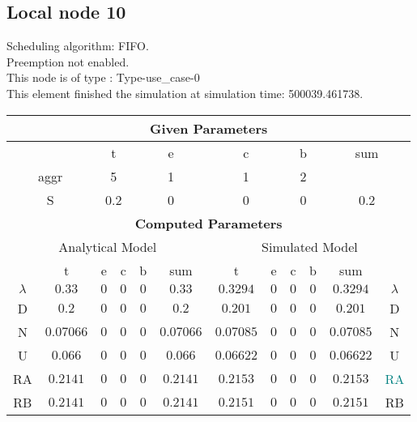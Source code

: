 \documentclass{article}
\begin{document}
\subsection{Local node 10}
Scheduling algorithm: FIFO.\\Preemption not enabled. \\This node is of type : Type-use\_case-0\\
This element finished the simulation at simulation time: 500039.461738.\\
\begin{table}[H]\centering\begin{tabular}{@{}c|cccc|c||cccc|c|c@{}}\toprule\multicolumn{12}{c}{\textbf{Given Parameters}}\\\midrule\multicolumn{2}{c|}{ } & \multicolumn{2}{c}{t} & \multicolumn{2}{c}{e} & \multicolumn{2}{c}{c} & \multicolumn{2}{c}{b} & \multicolumn{2}{|c}{sum} \\\midrule\multicolumn{2}{c|}{aggr} & \multicolumn{2}{c}{5} & \multicolumn{2}{c}{1} & \multicolumn{2}{c}{1} & \multicolumn{2}{c}{2} & \multicolumn{2}{|c}{ } \\ \midrule\multicolumn{2}{c|}{S} & \multicolumn{2}{c}{0.2} & \multicolumn{2}{c}{0} & \multicolumn{2}{c}{0} & \multicolumn{2}{c}{0} & \multicolumn{2}{|c}{0.2}\\ \midrule\midrule\multicolumn{12}{c}{\textbf{Computed Parameters}}\\ \midrule\multicolumn{6}{c||}{Analytical Model} & \multicolumn{6}{c}{Simulated Model}\\ 
 \midrule & t & e & c & b & sum & t & e & c & b & sum &  \\ \midrule$\lambda$ &$0.33$ & $0$ & $0$ & $0$ & $0.33$ & $0.3294$ & $0$ & $0$ & $0$ & $0.3294$& $\lambda$ \\D & $0.2$ & $0$ & $0$ & $0$ & $0.2$ & $0.201$ & $0$ & $0$ & $0$ & $0.201$& D\\N & $0.07066$ & $0$ & $0$ & $0$ & $0.07066$ & $0.07085$ & $0$ & $0$ & $0$ & $0.07085$& N\\U & $0.066$ & $0$ & $0$ & $0$ & $0.066$ & $0.06622$ & $0$ & $0$ & $0$ & $0.06622$& U\\RA & $0.2141$ & $0$ & $0$ & $0$ & $0.2141$ & $0.2153$ & $0$ & $0$ & $0$ & $0.2153$& \textcolor{teal}{RA}\\RB & $0.2141$ & $0$ & $0$ & $0$ & $0.2141$ & $0.2151$ & $0$ & $0$ & $0$ & $0.2151$& RB\\
\bottomrule
\end{tabular}
\end{table}
\filbreak
\end{document}
